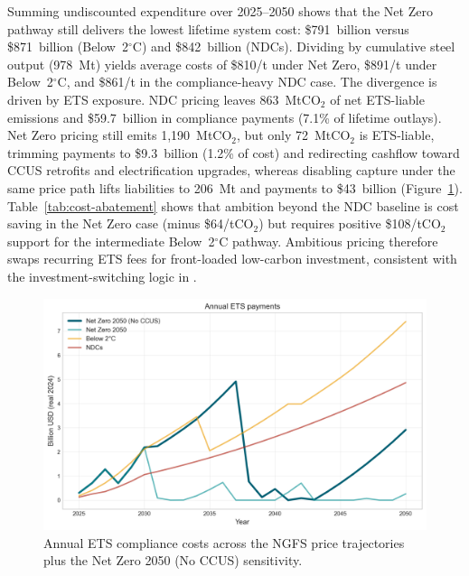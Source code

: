 \documentclass[preprint,1p,authoryear]{elsarticle}
\begin{document}
Summing undiscounted expenditure over 2025--2050 shows that the Net Zero pathway still delivers the lowest lifetime system cost: \$791~billion versus \$871~billion (Below~2$^\circ$C) and \$842~billion (NDCs). Dividing by cumulative steel output (978~Mt) yields average costs of \$810/t under Net Zero, \$891/t under Below~2$^\circ$C, and \$861/t in the compliance-heavy NDC case. The divergence is driven by ETS exposure. NDC pricing leaves 863~MtCO$_2$ of net ETS-liable emissions and \$59.7~billion in compliance payments (7.1\% of lifetime outlays). Net Zero pricing still emits 1,190~MtCO$_2$, but only 72~MtCO$_2$ is ETS-liable, trimming payments to \$9.3~billion (1.2\% of cost) and redirecting cashflow toward CCUS retrofits and electrification upgrades, whereas disabling capture under the same price path lifts liabilities to 206~Mt and payments to \$43~billion (Figure~\ref{fig:ets-costs}). Table~\ref{tab:cost-abatement} shows that ambition beyond the NDC baseline is cost saving in the Net Zero case (minus \$64/tCO$_2$) but requires positive \$108/tCO$_2$ support for the intermediate Below~2$^\circ$C pathway. Ambitious pricing therefore swaps recurring ETS fees for front-loaded low-carbon investment, consistent with the investment-switching logic in \citet{fowlie2016carbon}.

\begin{figure}[!t]
  \centering
  \includegraphics[width=0.8\linewidth]{ets_cost_by_scenario}
  \caption{Annual ETS compliance costs across the NGFS price trajectories plus the Net Zero 2050 (No CCUS) sensitivity.}
  \label{fig:ets-costs}
\end{figure}
\end{document}
